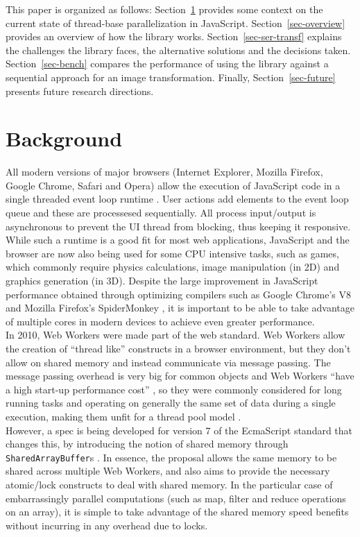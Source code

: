 \documentclass[runningheads,a4paper]{llncs}
\begin{document}
This paper is organized as follows: Section~\ref{sec-background} provides some context on the current state of thread-base parallelization in JavaScript. Section~\ref{sec-overview} provides an overview of how the library works. Section~\ref{sec-ser-transf} explains the challenges the library faces, the alternative solutions and the decisions taken. Section~\ref{sec-bench} compares the performance of using the library against a sequential approach for an image transformation. Finally, Section~\ref{sec-future} presents future research directions.

\section{Background}\label{sec-background}
All modern versions of major browsers (Internet Explorer, Mozilla Firefox, Google Chrome, Safari and Opera) allow the execution of JavaScript code in a single threaded event loop runtime \cite{event-loop}. User actions add elements to the event loop queue and these are processesed sequentially. All process input/output is asynchronous to prevent the UI thread from blocking, thus keeping it responsive.
While such a runtime is a good fit for most web applications, JavaScript and the browser are now also being used for some CPU intensive tasks, such as games, which commonly require physics calculations, image manipulation (in 2D) and graphics generation (in 3D). Despite the large improvement in JavaScript performance obtained through optimizing compilers such as Google Chrome's V8 \cite{v8} and Mozilla Firefox's SpiderMonkey \cite{spider-monkey}, it is important to be able to take advantage of multiple cores in modern devices to achieve even greater performance.\\
In 2010, Web Workers were made part of the web standard. Web Workers allow the creation of ``thread like'' constructs in a browser environment, but they don't allow on shared memory and instead communicate via message passing. The message passing overhead is very big for common objects and Web Workers ``have a high start-up performance cost'' \cite{w3c-ww}, so they were commonly considered for long running tasks and operating on generally the same set of data during a single execution, making them unfit for a thread pool  model \cite{thread-pool}.\\
However, a spec is being developed for version 7 of the EcmaScript standard that changes this, by introducing the notion of shared memory through \verb+SharedArrayBuffer+s \cite{sab}. In essence, the proposal allows the same memory to be shared across multiple Web Workers, and also aims to provide the necessary atomic/lock constructs to deal with shared memory. In the particular case of embarrassingly parallel computations (such as map, filter and reduce operations on an array), it is simple to take advantage of the shared memory speed benefits without incurring in any overhead due to locks.
\end{document}
